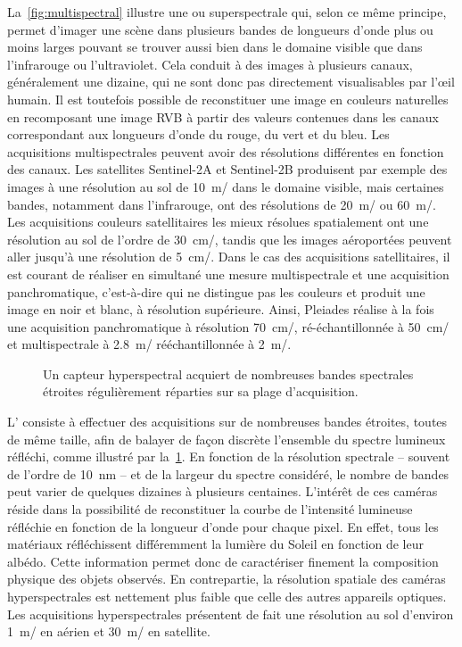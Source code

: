 La~\cref{fig:multispectral} illustre une  ou superspectrale qui, selon ce même principe, permet d'imager une scène dans plusieurs bandes de longueurs d'onde plus ou moins larges pouvant se trouver aussi bien dans le domaine visible que dans l'infrarouge ou l'ultraviolet. Cela conduit à des images à plusieurs canaux, généralement une dizaine, qui ne sont donc pas directement visualisables par l'\oe{}il humain. Il est toutefois possible de reconstituer une image en couleurs naturelles en recomposant une image \gls{RVB} à partir des valeurs contenues dans les canaux correspondant aux longueurs d'onde du rouge, du vert et du bleu. Les acquisitions multispectrales peuvent avoir des résolutions différentes en fonction des canaux. Les satellites Sentinel-2A et Sentinel-2B produisent par exemple des images à une résolution au sol de \SI{10}{\meter/\px} dans le domaine visible, mais certaines bandes, notamment dans l'infrarouge, ont des résolutions de \SI{20}{\meter/\px} ou \SI{60}{\meter/\px}. Les acquisitions couleurs satellitaires les mieux résolues spatialement ont une résolution au sol de l'ordre de \SI{30}{\centi\meter/\px}, tandis que les images aéroportées peuvent aller jusqu'à une résolution de \SI{5}{\centi\meter/\px}. Dans le cas des acquisitions satellitaires, il est courant de réaliser en simultané une mesure multispectrale et une acquisition panchromatique, c'est-à-dire qui ne distingue pas les couleurs et produit une image en noir et blanc, à résolution supérieure. Ainsi, \gls{Pleiades} réalise à la fois une acquisition panchromatique à résolution \SI{70}{\centi\meter/\px}, ré-échantillonnée à \SI{50}{\centi\meter/\px} et multispectrale à \SI{2,8}{\meter/\px} rééchantillonnée à \SI{2}{\meter/\px}.

\begin{figure}
  \resizebox{\textwidth}{!}{
  
  }
  \caption{Un capteur hyperspectral acquiert de nombreuses bandes spectrales étroites régulièrement réparties sur sa plage d'acquisition.}
  \label{fig:hyperspectral}
\end{figure}

L' consiste à effectuer des acquisitions sur de nombreuses bandes étroites, toutes de même taille, afin de balayer de façon discrète l'ensemble du spectre lumineux réfléchi, comme illustré par la~\cref{fig:hyperspectral}. En fonction de la résolution spectrale -- souvent de l'ordre de \SI{10}{\nano\meter} -- et de la largeur du spectre considéré, le nombre de bandes peut varier de quelques dizaines à plusieurs centaines. L'intérêt de ces caméras réside dans la possibilité de reconstituer la courbe de l'intensité lumineuse réfléchie en fonction de la longueur d'onde pour chaque pixel. En effet, tous les matériaux réfléchissent différemment la lumière du Soleil en fonction de leur albédo. Cette information permet donc de caractériser finement la composition physique des objets observés. En contrepartie, la résolution spatiale des caméras hyperspectrales est nettement plus faible que celle des autres appareils optiques. Les acquisitions hyperspectrales présentent de fait une résolution au sol d'environ \SI{1}{\meter/\px} en aérien et \SI{30}{\meter/\px} en satellite.

